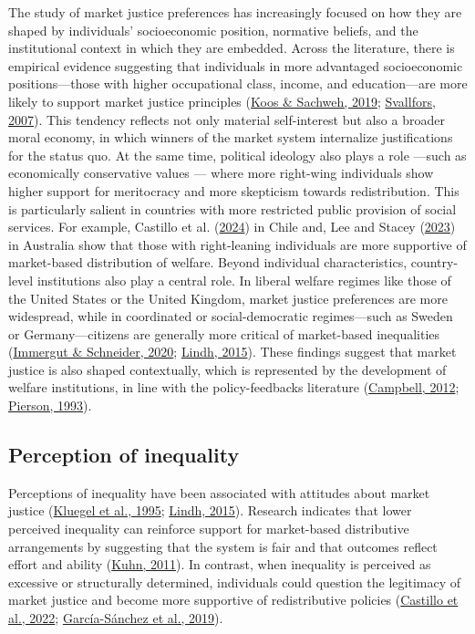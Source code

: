 \documentclass[
  12pt,
]{article}
\begin{document}
The study of market justice preferences has increasingly focused on how
they are shaped by individuals' socioeconomic position, normative
beliefs, and the institutional context in which they are embedded.
Across the literature, there is empirical evidence suggesting that
individuals in more advantaged socioeconomic positions---those with
higher occupational class, income, and education---are more likely to
support market justice principles
(\protect\hyperlink{ref-koos_moral_2019}{Koos \& Sachweh, 2019};
\protect\hyperlink{ref-svallfors_political_2007}{Svallfors, 2007}). This
tendency reflects not only material self-interest but also a broader
moral economy, in which winners of the market system internalize
justifications for the status quo. At the same time, political ideology
also plays a role ---such as economically conservative values --- where
more right-wing individuals show higher support for meritocracy and more
skepticism towards redistribution. This is particularly salient in
countries with more restricted public provision of social services. For
example, Castillo et al.
(\protect\hyperlink{ref-castillo_socialization_2024}{2024}) in Chile
and, Lee and Stacey (\protect\hyperlink{ref-lee_fairness_2023}{2023}) in
Australia show that those with right-leaning individuals are more
supportive of market-based distribution of welfare. Beyond individual
characteristics, country-level institutions also play a central role. In
liberal welfare regimes like those of the United States or the United
Kingdom, market justice preferences are more widespread, while in
coordinated or social-democratic regimes---such as Sweden or
Germany---citizens are generally more critical of market-based
inequalities (\protect\hyperlink{ref-immergut_it_2020}{Immergut \&
Schneider, 2020}; \protect\hyperlink{ref-lindh_public_2015}{Lindh,
2015}). These findings suggest that market justice is also shaped
contextually, which is represented by the development of welfare
institutions, in line with the policy-feedbacks literature
(\protect\hyperlink{ref-campbell_policy_2012}{Campbell, 2012};
\protect\hyperlink{ref-pierson_when_1993}{Pierson, 1993}).

\hypertarget{perception-of-inequality}{%
\subsection{Perception of inequality}\label{perception-of-inequality}}

Perceptions of inequality have been associated with attitudes about
market justice (\protect\hyperlink{ref-kluegel_social_1995a}{Kluegel et
al., 1995}; \protect\hyperlink{ref-lindh_public_2015}{Lindh, 2015}).
Research indicates that lower perceived inequality can reinforce support
for market-based distributive arrangements by suggesting that the system
is fair and that outcomes reflect effort and ability
(\protect\hyperlink{ref-kuhn_eye_2011}{Kuhn, 2011}). In contrast, when
inequality is perceived as excessive or structurally determined,
individuals could question the legitimacy of market justice and become
more supportive of redistributive policies
(\protect\hyperlink{ref-castillo_perception_2022}{Castillo et al.,
2022};
\protect\hyperlink{ref-garcia-sanchez_vicious_2019}{García-Sánchez et
al., 2019}).
\end{document}
